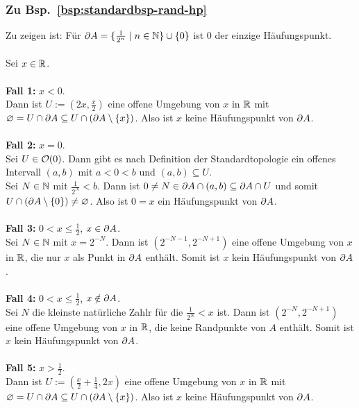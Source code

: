\subsubsection{Zu Bsp.~\ref{bsp:standardbsp-rand-hp}}\label{anh:standardbsp-rand-hp}
    Zu zeigen ist: Für $\partial A = \{\frac{1}{2^n} \mid n \in \mathbb{N}\} \cup \{0\}$ ist $0$ der einzige Häufungspunkt.\\ \ \\
    Sei $x \in \mathbb{R}$.\\ \ \\
        \textbf{Fall 1:} $x < 0$.\\
            Dann ist $U := (2x,\frac{x}{2})$ eine offene Umgebung von $x$ in $\mathbb{R}$ mit $\varnothing = U \cap \partial A \subseteq U \cap (\partial A \setminus \{x\})$.
            Also ist $x$ keine Häufungspunkt von $\partial A$.\\ \ \\
        \textbf{Fall 2:} $x = 0$.\\
            Sei $U \in \mathcal{O}({0})$. Dann gibt es nach Definition der Standardtopologie ein offenes Intervall $(a,b)$ mit $a < 0 < b$ und $(a,b) \subseteq U$.\\ 
            Sei $N \in \mathbb{N}$ mit $\frac{1}{2^N} < b$. 
            Dann ist $0 \neq N \in \partial A \cap (a,b) \subseteq \partial A \cap U$ und somit $U \cap (\partial A \setminus \{0\}) \neq \varnothing$. 
            Also ist $0 = x$ ein Häufungspunkt von $\partial A$.\\ \ \\
        \textbf{Fall 3:} $0 < x \leq \frac{1}{2}$, $x \in \partial A$.\\
            Sei $N \in \mathbb{N}$ mit $x = 2^{-N}$. Dann ist $(2^{-N-1}, 2^{-N+1})$ eine offene Umgebung von $x$ in $\mathbb{R}$, die nur $x$ als Punkt in $\partial A$ enthält.
            Somit ist $x$ kein Häufungspunkt von $\partial A$.\\ \ \\
        \textbf{Fall 4:} $0 < x \leq \frac{1}{2}$, $x \notin \partial A$.\\
            Sei $N$ die kleinste natürliche Zahlr für die $\frac{1}{2^N} < x$ ist. Dann ist $(2^{-N}, 2^{-N+1})$ eine offene Umgebung von $x$ in $\mathbb{R}$, die keine Randpunkte von $A$ enthält.
            Somit ist $x$ kein Häufungspunkt von $\partial A$.\\ \ \\
        \textbf{Fall 5:} $x > \frac{1}{2}$.\\
            Dann ist $U := (\frac{x}{2}+\frac{1}{4},2x)$ eine offene Umgebung von $x$ in $\mathbb{R}$ mit $\varnothing = U \cap \partial A \subseteq U \cap (\partial A \setminus \{x\})$.
            Also ist $x$ keine Häufungspunkt von $\partial A$.
    

